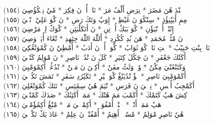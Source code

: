 \documentclass[a4paper, 10pt]{report}
\begin{document}
\begin{center}
\textarabic{(١٥٤) \textcolor{mygreen}{إٖنٖنْدَ هُنَ مَضَرَ  * نِرَضِ أَلْفُ مَرَ  * نَاوٖ أُوٖ نَ فِكِرَ  * مٗيٗ نِمٖكُؤُصِيَ }} 
\\[5mm] 

\textarabic{(١٥٥) \textcolor{mygreen}{مِمِ أُيَپٗنِؤُذِ  * سِتٗكُوَ نَ غَيْظِ  * إِوَپٗ وَتَكَ رَضِ  * نَ كْوَ عَلِيْ زٖنْڠٖيَ }} 
\\[5mm] 

\textarabic{(١٥٦) \textcolor{mygreen}{إِتُنْدٖ أُوٖ نْيَؤٗنِ  * كْوَ بَبَكٗ أُوٖ تِنِ  * نَ أَتَكَلٗبَئِنِ  * كْوَكٗ لِوٖ مَرْضِيَ }} 
\\[5mm] 

\textarabic{(١٥٧) \textcolor{mygreen}{نَ مْٹُمٖ مُحَمَدِ  * هَنَ بُدِ كُكُزِدِ  * أَللّٰهَ اللّٰهَ جِتَهِدِ  * نْڠَاءَ أُپَٹٖ وَصِيَ }} 
\\[5mm] 

\textarabic{(١٥٨) \textcolor{mygreen}{نَاءٖ بِنْتِ حَبِيْبُ  * كٖتِ نَاءٖ كْوَ ثَوَابُ  * كْوَكٖ أُوٖ نَ أَدَبُ  * أُمْطِيْ نَ كُمْوَنْڠُكِيَ }} 
\\[5mm] 

\textarabic{(١٥٩) \textcolor{mygreen}{أَكَتٗكَ جَعْفَرِ  * نَ چَكُلَ كِتَيَرِ  * كَلَ نَ نْدُيٖ نَاصِرِ  * نَ مْوَلِمُ كَتٗكٖيَ }} 
\\[5mm] 

\textarabic{(١٦٠) \textcolor{mygreen}{وَكَتَنْڠَنْيَ مِكٗنٗ  * وٗتٖ وَٹَٹُ مفَنٗ  * أَكِنٖنَ نَ مَنٖنٗ  * نْدُڠُيٖ أَكِمْوَمْبِيَ }} 
\\[5mm] 

\textarabic{(١٦١) \textcolor{mygreen}{أَكَمْوَمْبِيَ نَاصِرِ  * يٖؤٗ نْدُيَنْڠُ كْوَ خٖيْرِ  * تَكَپٗرُدِ سَفَرِ  * تَمَشَ تَكُلٖٹٖيَ }} 
\\[5mm] 

\textarabic{(١٦٢) \textcolor{mygreen}{أَكَمْجِبُ أُپٖسِ  * نِئٖٹٖيَ نَ فَرَسِ  * نْيَمَ هُيٗ سِمُئِسِ  * نَتَكَ كُمْوَنْڠَلِيَ }} 
\\[5mm] 

\textarabic{(١٦٣) \textcolor{mygreen}{كِشَ هَپٗ كَتَمْكَ  * أَكَمْبَ مَمَ هُتٗكَ  * مَمَكٖ أَكَئِنُكَ  * صَدَكَ كَمْتٗلٖيَ }} 
\\[5mm] 

\textarabic{(١٦٤) \textcolor{mygreen}{هَپٗ مَمَكٖ أَتٗكٖ  * إٖنٖنْدٖ أَمْفُوَتٖ  * أَكِمْٹٖمٖيَ مَٹٖ  * مْنْڠُ أَكِمُؤٗمْبٖيَ }} 
\\[5mm] 

\textarabic{(١٦٥) \textcolor{mygreen}{هُيٗ نَاصِرِ مْوَلِمُ  * مْسٗمٖشٖ أَهِتِمُ  * أُمْفُنْدٖ نَ عِلِمُ  * عَادَ يَكٗ تَكْوٖٹٖيَ }} 
\\[5mm] 


\end{center}
\end{document}
